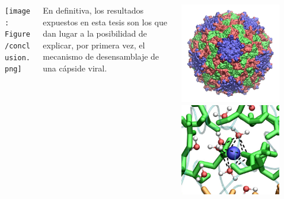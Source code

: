 \documentclass[8pt]{beamer}
\begin{document}
\begin{frame}
\centering
\begin{columns}
\begin{column}{0.2\textwidth}
\centering
\texttt{[image: Figure/conclusion.png]}
\end{column}
\begin{column}{0.6\textwidth}
\vfill
\centering
\Large En definitiva, los resultados expuestos en esta tesis son los que dan lugar a la posibilidad de explicar, por primera vez, el mecanismo de desensamblaje de una cápside viral.
\vfill
\end{column}
\begin{column}{0.2\textwidth}
\centering
\includegraphics[width=0.8\textwidth]{Figure/TrV_Capsid_Ch4.png}\\
\vspace{3cm}
\includegraphics[width=0.8\textwidth]{Figure/mg_sol.png}
\end{column}
\end{columns}
\end{frame}
\end{document}
